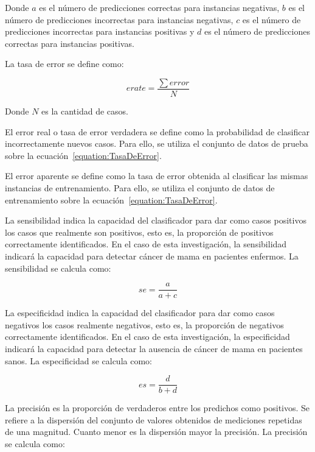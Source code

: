 \documentclass[conference]{IEEEtran}
\begin{document}
Donde $a$ es el número de predicciones correctas para instancias negativas, $b$ es el número de predicciones incorrectas para instancias negativas, $c$ es el número de predicciones incorrectas para instancias positivas y $d$ es el número de predicciones correctas para instancias positivas. \newline

La tasa de error se define como:

\begin{equation} \label{equation:TasaDeError}
	erate = \frac{\sum error}{N}
\end{equation}

Donde $N$ es la cantidad de casos. \newline

El error real o tasa de error verdadera se define como la probabilidad de clasificar incorrectamente nuevos casos. Para ello, se utiliza el conjunto de datos de prueba sobre la ecuación~\ref{equation:TasaDeError}. \newline

El error aparente se define como la tasa de error obtenida al clasificar las mismas instancias de entrenamiento. Para ello, se utiliza el conjunto de datos de entrenamiento sobre la ecuación~\ref{equation:TasaDeError}. \newline

La sensibilidad indica la capacidad del clasificador para dar como casos positivos los casos que realmente son positivos, esto es, la proporción de positivos correctamente identificados. En el caso de esta investigación, la sensibilidad indicará la capacidad para detectar cáncer de mama en pacientes enfermos. La sensibilidad se calcula como:

\begin{equation} \label{equation:Sensibilidad}
	se = \frac{a}{a + c}
\end{equation}

La especificidad indica la capacidad del clasificador para dar como casos negativos los casos realmente negativos, esto es, la proporción de negativos correctamente identificados. En el caso de esta investigación, la especificidad indicará la capacidad para detectar la ausencia de  cáncer de mama en pacientes sanos. La especificidad se calcula como:

\begin{equation} \label{equation:Especificidad}
	es = \frac{d}{b + d}
\end{equation}

La precisión es la proporción de verdaderos entre los predichos como positivos. Se refiere a la dispersión del conjunto de valores obtenidos de mediciones repetidas de una magnitud. Cuanto menor es la dispersión mayor la precisión. La precisión se calcula como:
\end{document}
